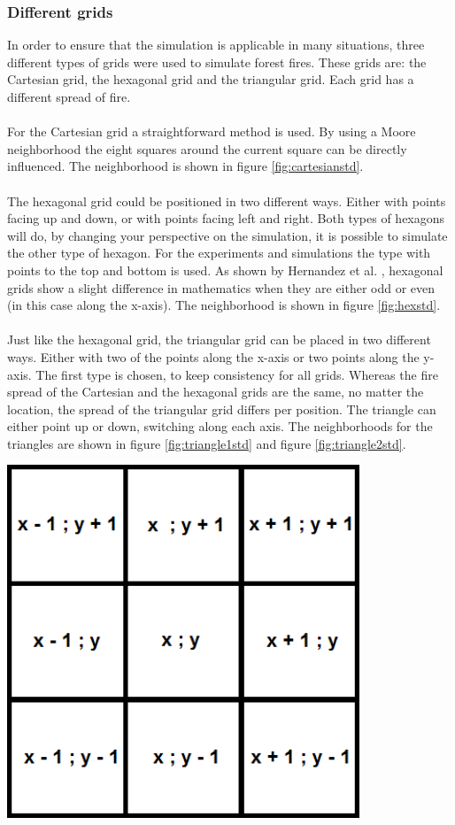 \documentclass{article}
\newenvironment{Figure}
  {\par\medskip\noindent\minipage{\linewidth}}
  {\endminipage\par\medskip}
\begin{document}
\begin{multicols}{2}
\subsubsection*{Different grids}
In order to ensure that the simulation is applicable in many situations, three different types of grids were used to simulate forest fires. These grids are: the Cartesian grid, the hexagonal grid and the triangular grid. Each grid has a different spread of fire.\\\\
For the Cartesian grid a straightforward method is used. By using a Moore neighborhood the eight squares around the current square can be directly influenced. The neighborhood is shown in figure \ref{fig:cartesianstd}.\\\\
The hexagonal grid could be positioned in two different ways. Either with points facing up and down, or with points facing left and right. Both types of hexagons will do, by changing your perspective on the simulation, it is possible to simulate the other type of hexagon. For the experiments and simulations the type with points to the top and bottom is used. As shown by Hernandez et al. \cite{HernandezEncinas20071213}, hexagonal grids show a slight difference in mathematics when they are either odd or even (in this case along the x-axis). The neighborhood is shown in figure \ref{fig:hexstd}.  \\\\
Just like the hexagonal grid, the triangular grid can be placed in two different ways. Either with two of the points along the x-axis or two points along the y-axis. The first type is chosen, to keep consistency for all grids. Whereas the fire spread of the Cartesian and the hexagonal grids are the same, no matter the location, the spread of the triangular grid differs per position. The triangle can either point up or down, switching along each axis. The neighborhoods for the triangles are shown in figure \ref{fig:triangle1std} and figure \ref{fig:triangle2std}.
\begin{Figure}
 \centering
 \includegraphics[width=0.79\textwidth]{imgs/cartesian.png}

\end{Figure}
\end{multicols}
\end{document}
